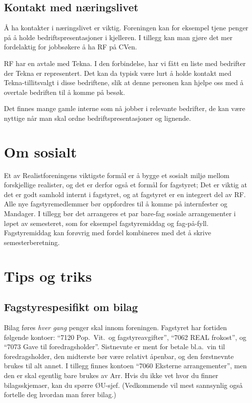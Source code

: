 \subsection{Kontakt med næringslivet}
Å ha kontakter i næringslivet er viktig. Foreningen kan for eksempel tjene
penger på å holde bedriftspresentasjoner i kjelleren. I tillegg kan man gjøre
det mer fordelaktig for jobbsøkere å ha RF på CVen.

RF har en avtale med Tekna. I den forbindelse, har vi fått en liste med bedrifter
der Tekna er representert. Det kan da typisk være lurt å holde kontakt med
Tekna-tillitsvalgt i disse bedriftene, slik at denne personen kan hjelpe oss
med å overtale bedriften til å komme på besøk.

Det finnes mange gamle interne som nå jobber i relevante bedrifter, de kan være
nyttige når man skal ordne bedriftspresentasjoner og lignende.


\section{Om sosialt}
Et av Realistforeningens viktigste formål er å bygge et sosialt miljø
mellom forskjellige realister, og det er derfor også et formål for
fagstyret; Det er viktig at det er godt samhold internt i fagstyret, og
at fagstyret er en integrert del av RF.
Alle nye fagstyremedlemmer bør oppfordres til å komme på internfester og Mandager.
I tillegg bør det arrangeres et par bare-fag sosiale arrangementer i løpet av
semesteret, som for eksempel fagstyremiddag og fag-på-fyll.
Fagstyremiddag kan forøvrig med fordel kombineres med det å skrive semesterberetning.

\section{Tips og triks}
\subsection{Fagstyrespesifikt om bilag}
\label{fagstyret:sec:bilag}
Bilag føres \emph{hver gang} penger skal innom foreningen. 
Fagstyret har fortiden følgende kontoer:
``7120 Pop.~Vit.~og fagstyreavgifter'',
``7062 REAL frokost'', og
``7073 Gave til foredragsholder''.
Sistnevnte er ment for  betale bl.a.~vin til foredragsholder,
den midterste bør være relativt åpenbar,
og den førstnevnte brukes til alt annet.
I tillegg finnes kontoen
``7060 Eksterne arrangementer'', men den er skal egentlig bare brukes av Arr.
Hvis du ikke vet hvor du finner bilagsskjemaer, kan du spørre ØU-sjef.
(Vedkommende vil mest sannsynlig også fortelle deg hvordan man fører bilag.)

